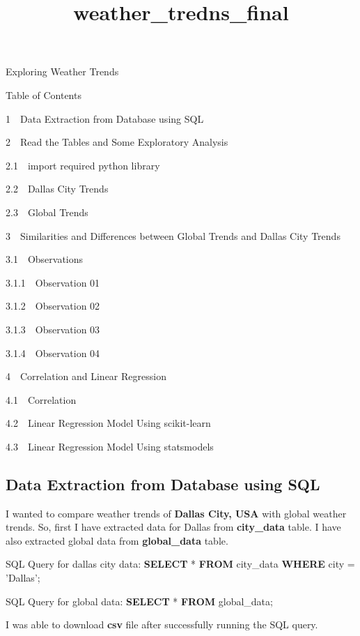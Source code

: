 \documentclass[11pt]{article}
\title{weather\_tredns\_final}
\begin{document}
    
    
    \maketitle
    
    

    
    Exploring Weather Trends

    Table of Contents{}

{{1~~}Data Extraction from Database using SQL}

{{2~~}Read the Tables and Some Exploratory Analysis}

{{2.1~~}import required python library}

{{2.2~~}Dallas City Trends}

{{2.3~~}Global Trends}

{{3~~}Similarities and Differences between Global Trends and Dallas City
Trends}

{{3.1~~}Observations}

{{3.1.1~~}Observation 01}

{{3.1.2~~}Observation 02}

{{3.1.3~~}Observation 03}

{{3.1.4~~}Observation 04}

{{4~~}Correlation and Linear Regression}

{{4.1~~}Correlation}

{{4.2~~}Linear Regression Model Using scikit-learn}

{{4.3~~}Linear Regression Model Using statsmodels}

    \subsection{Data Extraction from Database using
SQL}\label{data-extraction-from-database-using-sql}

    I wanted to compare weather trends of \textbf{Dallas City, USA} with
global weather trends. So, first I have extracted data for Dallas from
\textbf{city\_data} table. I have also extracted global data from
\textbf{global\_data} table.

    SQL Query for dallas city data: \textbf{SELECT} * \textbf{FROM}
city\_data \textbf{WHERE} city = 'Dallas';

SQL Query for global data: \textbf{SELECT} * \textbf{FROM} global\_data;

    I was able to download \textbf{csv} file after successfully running the
SQL query.
\end{document}

